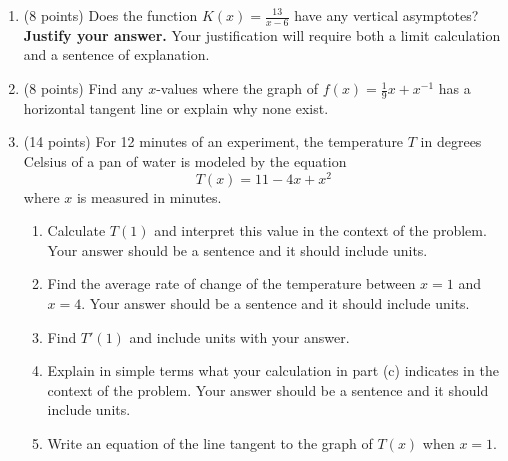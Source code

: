 \documentclass[12pt]{article}
\begin{document}
\begin{enumerate}
\newpage
\item (8 points) Does the function $K(x)=\frac{13}{x-6}$ have any vertical asymptotes? \textbf{Justify your answer.} Your justification will require both a limit calculation and a sentence of explanation.
\vfill
\item (8 points) Find any $x$-values where the graph of $f(x)=\frac{1}{9}x+x^{-1}$ has a horizontal tangent line or explain why none exist. 
\vfill
\newpage
\item (14 points) For 12 minutes of an experiment, the temperature $T$ in degrees Celsius of a pan of water is modeled by the equation 
$$T(x)=11-4x+x^2$$ where $x$ is measured in minutes. 
	\begin{enumerate}
	\item Calculate $T(1)$ and interpret this value in the context of the problem. Your answer should be a sentence and it should include units.
	\vfill
	\item Find the average rate of change of the temperature between $x=1$ and $x=4.$ Your answer should be a sentence and it should include units.
	\vfill
	\item Find $T'(1)$ and include units with your answer.
	\vfill
	\item Explain in simple terms what your calculation in part (c) indicates in the context of the problem. Your answer should be a sentence and it should include units.
	\vfill
	\item Write an equation of the line tangent to the graph of $T(x)$ when $x=1.$
	\vfill
	\end{enumerate}
\newpage


\end{enumerate}
\end{document}
